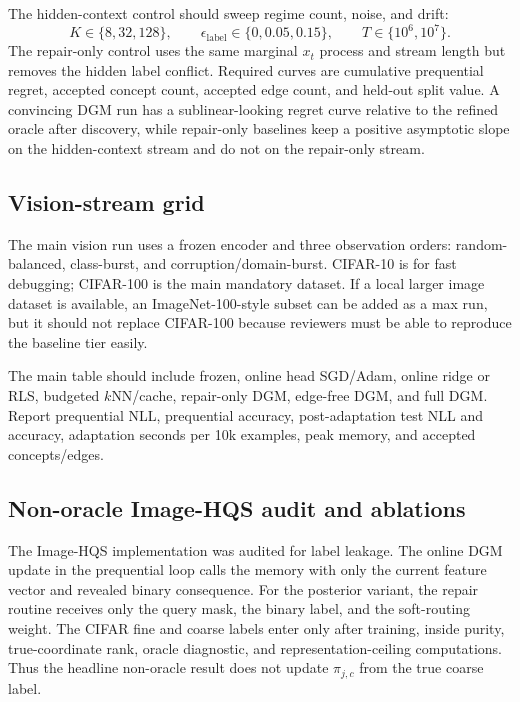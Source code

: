The hidden-context control should sweep regime count, noise, and drift:
\[
K\in\{8,32,128\},\qquad
\epsilon_{\mathrm{label}}\in\{0,0.05,0.15\},\qquad
T\in\{10^6,10^7\}.
\]
The repair-only control uses the same marginal $x_t$ process and stream length
but removes the hidden label conflict. Required curves are cumulative
prequential regret, accepted concept count, accepted edge count, and held-out
split value. A convincing DGM run has a sublinear-looking regret curve relative
to the refined oracle after discovery, while repair-only baselines keep a
positive asymptotic slope on the hidden-context stream and do not on the
repair-only stream.

\subsection{Vision-stream grid}

The main vision run uses a frozen encoder and three observation orders:
random-balanced, class-burst, and corruption/domain-burst. CIFAR-10 is for fast
debugging; CIFAR-100 is the main mandatory dataset. If a local larger image
dataset is available, an ImageNet-100-style subset can be added as a max run,
but it should not replace CIFAR-100 because reviewers must be able to reproduce
the baseline tier easily.

The main table should include frozen, online head SGD/Adam, online ridge or RLS,
budgeted $k$NN/cache, repair-only DGM, edge-free DGM, and full DGM. Report
prequential NLL, prequential accuracy, post-adaptation test NLL and accuracy,
adaptation seconds per 10k examples, peak memory, and accepted concepts/edges.

\subsection{Non-oracle Image-HQS audit and ablations}
\label{app:image-hqs-audit}

The Image-HQS implementation was audited for label leakage. The online DGM
update in the prequential loop calls the memory with only the current feature
vector and revealed binary consequence. For the posterior variant, the repair
routine receives only the query mask, the binary label, and the soft-routing
weight. The CIFAR fine and coarse labels enter only after training, inside
purity, true-coordinate rank, oracle diagnostic, and representation-ceiling
computations. Thus the headline non-oracle result does not update
$\pi_{j,c}$ from the true coarse label.

